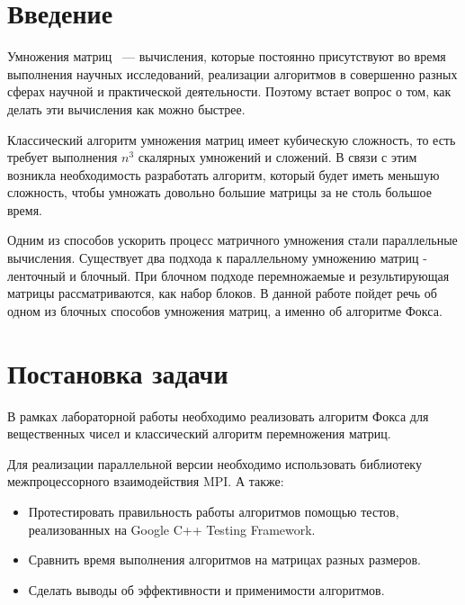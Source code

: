 \documentclass{report}
\begin{document}
\setcounter{page}{2}

\tableofcontents
\newpage

\section*{Введение}

Умножения матриц ~--- вычисления, которые постоянно присутствуют во время выполнения научных исследований, реализации алгоритмов в совершенно разных сферах научной и практической деятельности. Поэтому встает вопрос о том, как делать эти вычисления как можно быстрее.
\par
Классический алгоритм умножения матриц имеет кубическую сложность, то есть требует выполнения $n^3$ скалярных умножений и сложений. В связи с этим возникла необходимость разработать алгоритм, который будет иметь меньшую сложность, чтобы умножать довольно большие матрицы за не столь большое время.
\par
Одним из способов ускорить процесс матричного умножения стали параллельные вычисления. Существует два подхода к параллельному умножению матриц - ленточный и блочный. При блочном подходе перемножаемые и результирующая матрицы рассматриваются, как набор блоков. В данной работе пойдет речь об одном из блочных способов умножения матриц, а именно об алгоритме Фокса.

\newpage

\section*{Постановка задачи}
В рамках лабораторной работы необходимо реализовать алгоритм Фокса для вещественных чисел и классический алгоритм перемножения матриц.
\par Для реализации параллельной версии необходимо использовать библиотеку межпроцессорного взаимодействия MPI. А также:
\begin{itemize}
    \item Протестировать правильность работы алгоритмов помощью тестов, реализованных на Google C++ Testing Framework. 
    \item Сравнить время выполнения алгоритмов на матрицах разных размеров.
    \item Сделать выводы об эффективности и применимости алгоритмов.
\end{itemize}
\newpage
\end{document}
